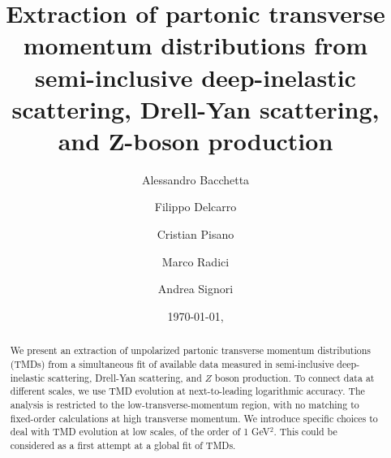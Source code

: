 \documentclass[aps,preprintnumbers,showpacs,nofootinbib,superscriptaddress,floatfix]{revtex4}
\begin{document}
\allowdisplaybreaks[2]


\title{
Extraction of partonic transverse momentum distributions 
from semi-inclusive 
deep-inelastic scattering, Drell-Yan scattering, and Z-boson production
}

\author{Alessandro Bacchetta}

\author{Filippo Delcarro}

\author{Cristian Pisano}

\author{Marco Radici}

\author{Andrea Signori}


\begin{abstract}
We present an extraction of unpolarized partonic transverse momentum
distributions (TMDs) 
from a simultaneous fit of available data measured in semi-inclusive 
deep-inelastic scattering, 
Drell-Yan scattering, and $Z$ boson production. 
To connect data at different scales, we use TMD evolution at next-to-leading logarithmic accuracy. The
analysis is restricted to the low-transverse-momentum region, with no matching
to fixed-order calculations at high transverse momentum. We introduce specific
choices to deal with TMD evolution at low scales, of the order of 1 GeV$^2$.
This could be considered as a first attempt at a global fit of TMDs.
\end{abstract}


\date{\today, \currenttime}
\end{document}
